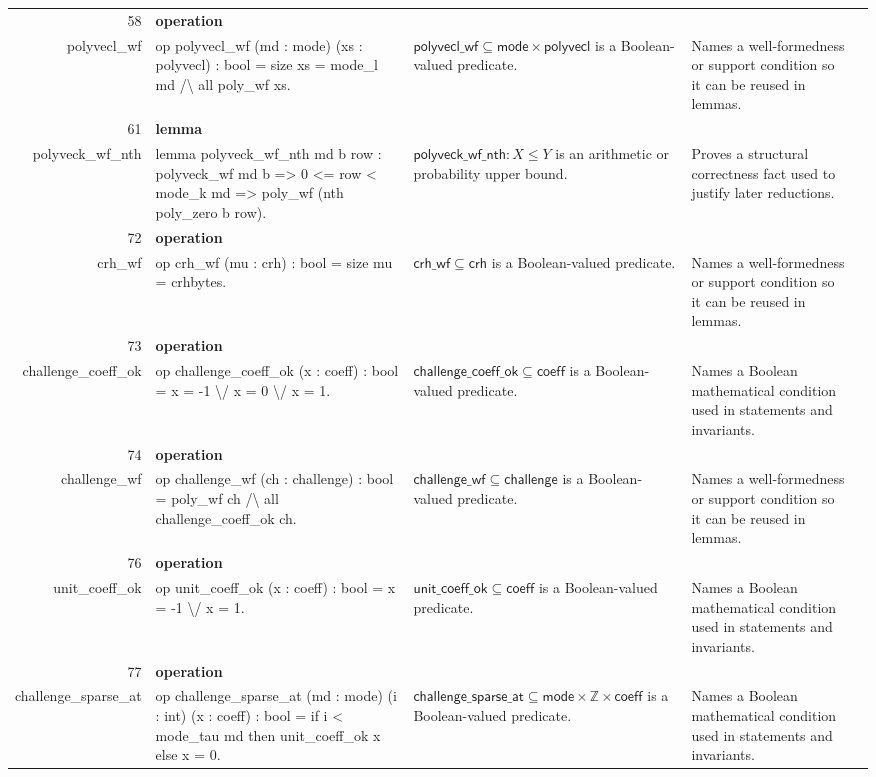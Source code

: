 \documentclass[10pt]{article}
\newcommand{\ec}[1]{\begingroup\ttfamily\scriptsize #1\endgroup}
\begin{document}
\begin{longtable}{r L{0.17\textwidth} L{0.26\textwidth} L{0.27\textwidth} L{0.20\textwidth}}
58 & \textbf{operation}\\\ec{polyvecl\_wf} & \ec{op polyvecl\_wf (md : mode) (xs : polyvecl) : bool = size xs = mode\_l md /\textbackslash{} all poly\_wf xs.} & \(\mathsf{polyvecl\_wf} \subseteq \mathsf{mode} \times \mathsf{polyvecl}\) is a Boolean-valued predicate. & Names a well-formedness or support condition so it can be reused in lemmas. \\
61 & \textbf{lemma}\\\ec{polyveck\_wf\_nth} & \ec{lemma polyveck\_wf\_nth md b row : polyveck\_wf md b => 0 <= row < mode\_k md => poly\_wf (nth poly\_zero b row).} & \(\mathsf{polyveck\_wf\_nth} : X \le Y\) is an arithmetic or probability upper bound. & Proves a structural correctness fact used to justify later reductions. \\
72 & \textbf{operation}\\\ec{crh\_wf} & \ec{op crh\_wf (mu : crh) : bool = size mu = crhbytes.} & \(\mathsf{crh\_wf} \subseteq \mathsf{crh}\) is a Boolean-valued predicate. & Names a well-formedness or support condition so it can be reused in lemmas. \\
73 & \textbf{operation}\\\ec{challenge\_coeff\_ok} & \ec{op challenge\_coeff\_ok (x : coeff) : bool = x = -1 \textbackslash{}/ x = 0 \textbackslash{}/ x = 1.} & \(\mathsf{challenge\_coeff\_ok} \subseteq \mathsf{coeff}\) is a Boolean-valued predicate. & Names a Boolean mathematical condition used in statements and invariants. \\
74 & \textbf{operation}\\\ec{challenge\_wf} & \ec{op challenge\_wf (ch : challenge) : bool = poly\_wf ch /\textbackslash{} all challenge\_coeff\_ok ch.} & \(\mathsf{challenge\_wf} \subseteq \mathsf{challenge}\) is a Boolean-valued predicate. & Names a well-formedness or support condition so it can be reused in lemmas. \\
76 & \textbf{operation}\\\ec{unit\_coeff\_ok} & \ec{op unit\_coeff\_ok (x : coeff) : bool = x = -1 \textbackslash{}/ x = 1.} & \(\mathsf{unit\_coeff\_ok} \subseteq \mathsf{coeff}\) is a Boolean-valued predicate. & Names a Boolean mathematical condition used in statements and invariants. \\
77 & \textbf{operation}\\\ec{challenge\_sparse\_at} & \ec{op challenge\_sparse\_at (md : mode) (i : int) (x : coeff) : bool = if i < mode\_tau md then unit\_coeff\_ok x else x = 0.} & \(\mathsf{challenge\_sparse\_at} \subseteq \mathsf{mode} \times \mathbb{Z} \times \mathsf{coeff}\) is a Boolean-valued predicate. & Names a Boolean mathematical condition used in statements and invariants. \\

\end{longtable}
\end{document}
